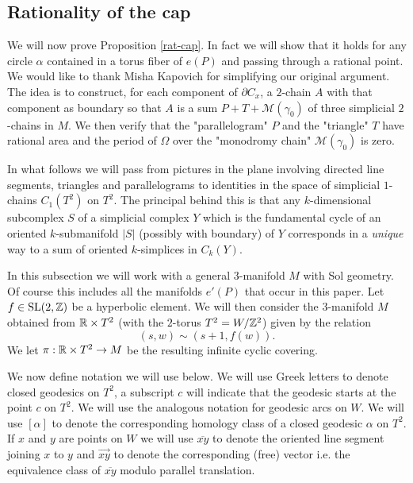 \subsection{Rationality of the cap}\label{rat-cap11}
We will now prove Proposition \ref{rat-cap}.  In fact we will show that it holds for any circle $\alpha$ contained in a torus fiber of $e(P)$ and passing through a rational point. We would like to thank Misha Kapovich for simplifying  our original argument. The idea is to construct, for each component of $\partial C_x$, a $2$-chain $A$ with that component as boundary so that $A$ is a sum $P+ T  +\mathcal{M}(\gamma_0)$ of three simplicial $2$-chains in $M$. We then verify that the "parallelogram" $P$  and the "triangle" $T$  have rational area and the period of $\Omega$ over the "monodromy chain" $\mathcal{M}(\gamma_0)$ is zero. 

In what follows we will pass from pictures in the plane involving directed line segments, triangles and parallelograms to identities in the space of simplicial $1$-chains $C_1(T^2)$  on $T^2$. The principal behind this is that any $k$-dimensional subcomplex $S$ of a simplicial complex $Y$ which is the fundamental cycle of an oriented $k$-submanifold $|S|$ (possibly with boundary) of $Y$ corresponds in a {\it unique} way to a sum of oriented $k$-simplices in $C_k(Y)$.



In this subsection we will work with a general $3$-manifold $M$ with Sol geometry. Of course this includes all the manifolds $e'(P)$ that occur in this paper. Let $f \in \operatorname{SL}(2,\mathbb{Z})$ be a hyperbolic element. We will then consider the $3$-manifold $M$ obtained from $ \mathbb{R} \times T^2$ (with the $2$-torus $T^2 = W/ \mathbb{Z}^2$) given by the relation
\begin{equation}\label{glueing}
(s,w) \sim (s+1,f(w)).  
\end{equation}
We let $\pi: \mathbb{R}\times T^2 \to M$ be the resulting infinite cyclic covering. 



We now define notation we will use below. We will use Greek letters to denote closed geodesics on $T^2$, a subscript $c$  will indicate that the geodesic starts at the point $c$ on $T^2$. We will use the analogous notation for geodesic arcs on $W$.  We will use $[\alpha]$ 
to denote the corresponding homology class of a closed geodesic $\alpha$ on $T^2$. 
If $x$ and $y$ are points on $W$ we will use $\overline{xy}$ to denote the oriented line segment joining $x$ to $y$ and $\overrightarrow{xy}$ to denote the corresponding (free) vector
i.e. the equivalence class of $\overline{xy}$ modulo parallel translation. 
   
